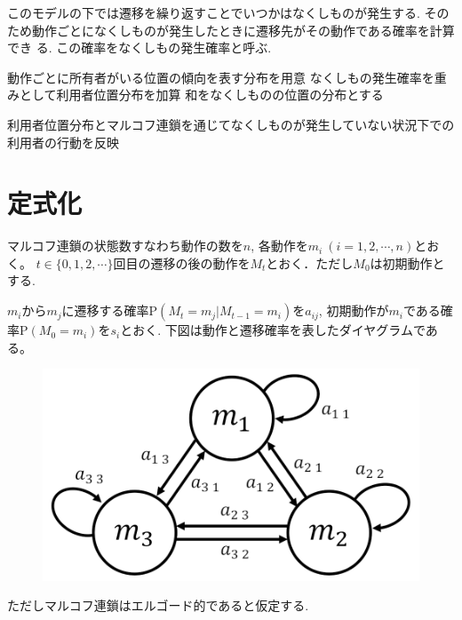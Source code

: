 \begin{description}
このモデルの下では遷移を繰り返すことでいつかはなくしものが発生する.
そのため動作ごとになくしものが発生したときに遷移先がその動作である確率を計算でき
る.
この確率をなくしもの発生確率と呼ぶ.


動作ごとに所有者がいる位置の傾向を表す分布を用意
なくしもの発生確率を重みとして利用者位置分布を加算
和をなくしものの位置の分布とする

利用者位置分布とマルコフ連鎖を通じてなくしものが発生していない状況下での利用者の行動を反映

\section{定式化}
マルコフ連鎖の状態数すなわち動作の数を$ n $, 各動作を$ m_i\ (i=1,2,\cdots ,n)$とおく。
$ t \in \{0,1,2,\cdots\} $回目の遷移の後の動作を$ M_t $とおく．ただし$ M_0 $は初期動作とする. 

$ m_i $から$ m_j $に遷移する確率$ \mathrm{P}(M_t = m_j | M_{t-1} = m_i) $を$ a_{i j} $, 
初期動作が$ m_i $である確率$ \mathrm{P}(M_0 = m_i) $を$ s_i $とおく. 
下図は動作と遷移確率を表したダイヤグラムである。
\begin{figure}[H]
    \begin{center}
    \includegraphics[width=0.5\linewidth]{figs/tr_prob.png}
    \label{fig:a}
    \end{center}
\end{figure}

ただしマルコフ連鎖はエルゴード的\cite{funaki}であると仮定する. 


\end{description}
